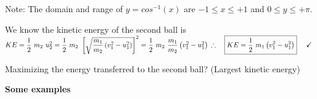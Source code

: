 \documentclass[fleqn]{article}
\begin{document}
Note: The domain and range of $y=cos^{-1}(x)$ are $-1 \leq x \leq +1$ and $0 \leq y \leq +\pi$. 

We know the kinetic energy of the second ball is 
$
  \\
  \\
  KE=\dfrac{1}{2} ~ m_2 ~ u_2^2=\dfrac{1}{2} ~ m_2 ~ \left[
    \sqrt{\dfrac{m_1}{m_2} \left(v_1^2-u_1^2\right)}
  \right]^2
  =\dfrac{1}{2} ~ m_2 ~ \dfrac{m_1}{m_2} \left(v_1^2-u_1^2\right)
  \\
  \\
  \\
  \therefore ~~~ \boxed{
    KE=\dfrac{1}{2} ~ m_1 \left(v_1^2-u_1^2\right)
  } ~~~~ \checkmark
  \\
  \\
$

Maximizing the energy transferred to the second ball? (Largest kinetic energy)

\vspace{10px}

\textbf{Some examples}

\vspace{10px}
\end{document}
